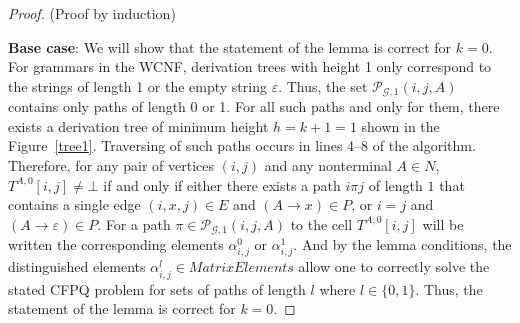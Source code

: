 \begin{proof}(Proof by induction)

\textbf{Base case}: %
We will show that the statement of the lemma is correct for $k = 0$. For grammars in the WCNF, derivation trees with height 1 only correspond to the strings of length 1 or the empty string $\varepsilon$. Thus, the set $\mathcal{P}_{\mathcal{G}, 1}(i, j, A)$ contains only paths of length 0 or 1. For all such paths and only for them, there exists a derivation tree of minimum height $h = k + 1 = 1$ shown in the Figure~\ref{tree1}. Traversing of such paths occurs in lines 4--8 of the algorithm. Therefore, for any pair of vertices $(i, j)$ and any nonterminal $A \in N$, $T^{A, 0}[i, j] \neq \bot$ if and only if either there exists a path $i \pi j$ of length $1$ that contains a single edge $(i, x, j) \in E$ and $(A \rightarrow x) \in P$, or $i = j$ and $(A \rightarrow \varepsilon) \in P$. For a path $\pi \in \mathcal{P}_{\mathcal{G}, 1}(i, j, A)$ to the cell $T^{A, 0}[i, j]$ will be written the corresponding elements $\alpha^0_{i, j}$ or $\alpha^1_{i, j}$. And by the lemma conditions, the distinguished elements $\alpha^l_{i, j} \in \textit{MatrixElements}$ allow one to correctly solve the stated CFPQ problem for sets of paths of length $l$ where $l \in \{0, 1\}$. Thus, the statement of the lemma is correct for $k = 0$.
	

\end{proof}

